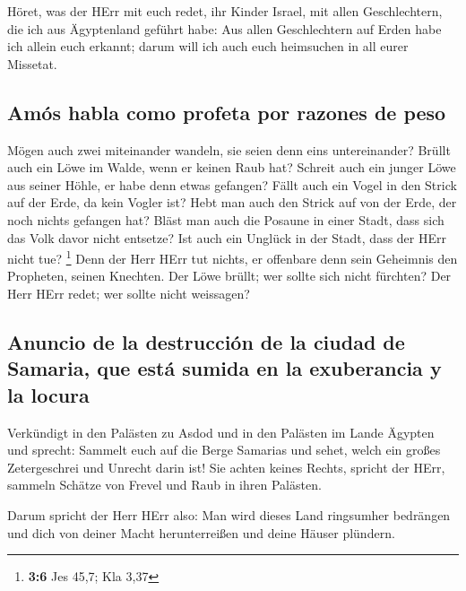  Höret, was der HErr mit euch redet, ihr Kinder Israel,
mit allen Geschlechtern, die ich aus Ägyptenland geführt habe:
 Aus allen Geschlechtern auf Erden habe ich allein euch
erkannt; darum will ich auch euch heimsuchen in all eurer Missetat.

\hypertarget{amuxf3s-habla-como-profeta-por-razones-de-peso}{%
\subsection{Amós habla como profeta por razones de
peso}\label{amuxf3s-habla-como-profeta-por-razones-de-peso}}

 Mögen auch zwei miteinander wandeln, sie seien denn eins
untereinander?  Brüllt auch ein Löwe im Walde, wenn er
keinen Raub hat? Schreit auch ein junger Löwe aus seiner Höhle, er habe
denn etwas gefangen?  Fällt auch ein Vogel in den Strick
auf der Erde, da kein Vogler ist? Hebt man auch den Strick auf von der
Erde, der noch nichts gefangen hat?  Bläst man auch die
Posaune in einer Stadt, dass sich das Volk davor nicht entsetze? Ist
auch ein Unglück in der Stadt, dass der HErr nicht tue? \footnote{\textbf{3:6}
  Jes 45,7; Kla 3,37}  Denn der Herr HErr tut nichts, er
offenbare denn sein Geheimnis den Propheten, seinen Knechten.
 Der Löwe brüllt; wer sollte sich nicht fürchten? Der Herr
HErr redet; wer sollte nicht weissagen?

\hypertarget{anuncio-de-la-destrucciuxf3n-de-la-ciudad-de-samaria-que-estuxe1-sumida-en-la-exuberancia-y-la-locura}{%
\subsection{Anuncio de la destrucción de la ciudad de Samaria, que está
sumida en la exuberancia y la
locura}\label{anuncio-de-la-destrucciuxf3n-de-la-ciudad-de-samaria-que-estuxe1-sumida-en-la-exuberancia-y-la-locura}}

 Verkündigt in den Palästen zu Asdod und in den Palästen
im Lande Ägypten und sprecht: Sammelt euch auf die Berge Samarias und
sehet, welch ein großes Zetergeschrei und Unrecht darin ist!
 Sie achten keines Rechts, spricht der HErr, sammeln
Schätze von Frevel und Raub in ihren Palästen.

 Darum spricht der Herr HErr also: Man wird dieses Land
ringsumher bedrängen und dich von deiner Macht herunterreißen und deine
Häuser plündern.

